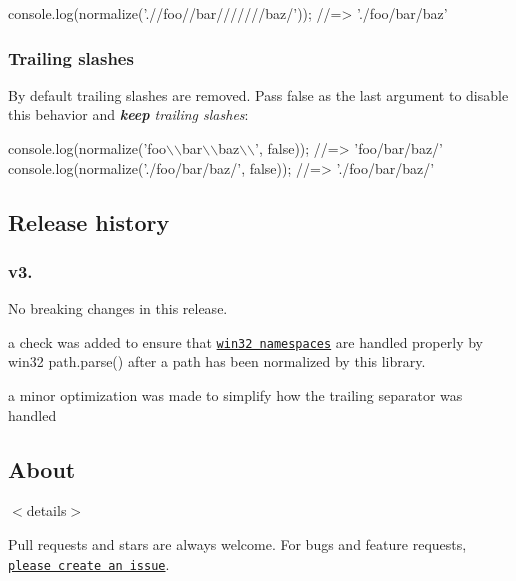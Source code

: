 \begin{DoxyCode}
console.log(normalize('.//foo//bar///////baz/')); 
//=> './foo/bar/baz'
\end{DoxyCode}


\subsubsection*{Trailing slashes}

By default trailing slashes are removed. Pass {\ttfamily false} as the last argument to disable this behavior and {\itshape {\bfseries keep} trailing slashes}\+:


\begin{DoxyCode}
console.log(normalize('foo\(\backslash\)\(\backslash\)bar\(\backslash\)\(\backslash\)baz\(\backslash\)\(\backslash\)', false)); //=> 'foo/bar/baz/'
console.log(normalize('./foo/bar/baz/', false)); //=> './foo/bar/baz/'
\end{DoxyCode}


\subsection*{Release history}

\subsubsection*{v3.}

No breaking changes in this release.


\begin{DoxyItemize}
\item a check was added to ensure that \href{https://msdn.microsoft.com/library/windows/desktop/aa365247(v=vs.85).aspx#namespaces}{\tt win32 namespaces} are handled properly by win32 {\ttfamily path.\+parse()} after a path has been normalized by this library.
\item a minor optimization was made to simplify how the trailing separator was handled
\end{DoxyItemize}

\subsection*{About}

$<$details$>$

Pull requests and stars are always welcome. For bugs and feature requests, \href{../../issues/new}{\tt please create an issue}.

